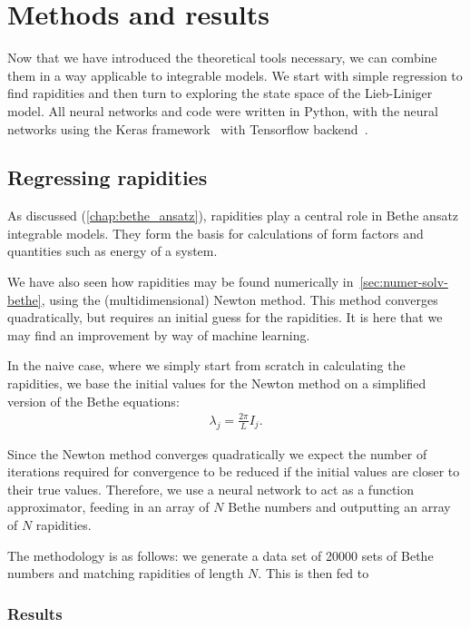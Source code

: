 \documentclass[11pt, a4paper]{report} %
\begin{document}
\chapter{Methods and results}\label{chap:results}

Now that we have introduced the theoretical tools necessary, we can combine them in a way applicable to integrable models.
We start with simple regression to find rapidities and then turn to exploring the state space of the Lieb-Liniger model.
All neural networks and code were written in Python, with the neural networks using the Keras framework~\cite{chollet2015keras} with Tensorflow backend~\cite{tensorflow2015-whitepaper}.

\section{Regressing rapidities}

As discussed (\cref{chap:bethe_ansatz}), rapidities play a central role in Bethe ansatz integrable models.
They form the basis for calculations of form factors and quantities such as energy of a system.

We have also seen how rapidities may be found numerically in~\cref{sec:numer-solv-bethe}, using the (multidimensional) Newton method.
This method converges quadratically, but requires an initial guess for the rapidities.
It is here that we may find an improvement by way of machine learning.

In the naive case, where we simply start from scratch in calculating the rapidities, we base the initial values for the Newton method on a simplified version of the Bethe equations:
\begin{align}
  \label{eq:12}
  \lambda_j = \frac{2\pi}{L} I_j.
\end{align}

Since the Newton method converges quadratically we expect the number of iterations required for convergence to be reduced if the initial values are closer to their true values.
Therefore, we use a neural network to act as a function approximator, feeding in an array of \(N\) Bethe numbers and outputting an array of \(N\) rapidities.

The methodology is as follows: we generate a data set of 20000 sets of Bethe numbers and matching rapidities of length \(N\).
This is then fed to

\subsection{Results}
\end{document}
